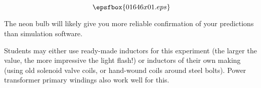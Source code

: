

$$\epsfbox{01646x01.eps}$$

\vfil \eject






The neon bulb will likely give you more reliable confirmation of your predictions than simulation software.







Students may either use ready-made inductors for this experiment (the larger the value, the more impressive the light flash!) or inductors of their own making (using old solenoid valve coils, or hand-wound coils around steel bolts).  Power transformer primary windings also work well for this.




